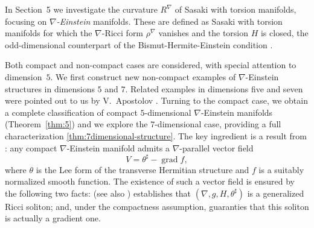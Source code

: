 \documentclass{article}
\theoremstyle{definition}
\numberwithin{equation}{section}
\begin{document}
In Section~5 we investigate the curvature $R^\nabla$ of Sasaki with torsion manifolds, focusing on \emph{$\nabla$-Einstein} manifolds. These are defined as Sasaki with torsion manifolds for which the $\nabla$-Ricci form $\rho^\nabla$ vanishes and the torsion $H$ is closed, the odd-dimensional counterpart of the Bismut-Hermite-Einstein condition \cite{GJS2023}.

Both compact and non-compact cases are considered, with special attention to dimension~$5$. We first construct new non-compact examples of $\nabla$-Einstein structures in dimensions $5$ and $7$. Related examples in dimensions five and seven were pointed out to us by
V.~Apostolov \cite{ApostolovPrivate2026}. Turning to the compact case, we obtain a complete classification of compact $5$-dimensional $\nabla$-Einstein manifolds (Theorem~\ref{thm:5}) and we explore the $7$-dimensional case, providing a full characterization \ref{thm:7dimensional-structure}. The key ingredient is a result from \cite{KS}: any compact $\nabla$-Einstein manifold admits a $\nabla$-parallel vector field
\[
V = \theta^{\sharp} - \operatorname{grad} f,
\]
where $\theta$ is the Lee form of the transverse Hermitian structure and $f$ is a suitably normalized smooth function. The existence of such a vector field is ensured by the following two facts: \cite{FI} (see also \cite{KS}) establishes that $(\nabla, g, H, \theta^\sharp)$ is a generalized Ricci soliton; and, under the compactness assumption, \cite{GFStr} guaranties that this soliton is actually a gradient one.
\end{document}
